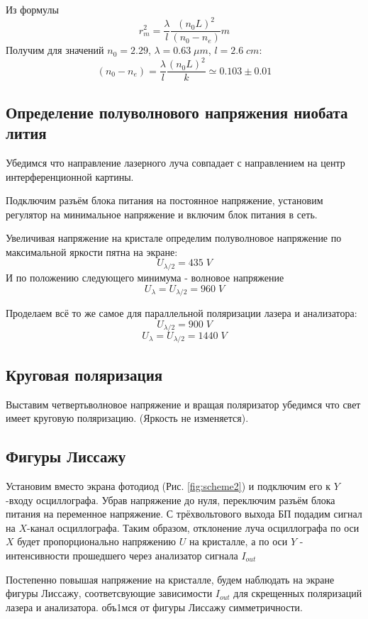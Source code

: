 \documentclass{article}
\begin{document}
Из формулы
\[ r_m^2 = \frac{\lambda}{l}\frac{(n_0L)^2}{(n_0-n_e)}m\]
Получим для значений \(n_0 = 2.29\), \(\lambda = 0.63\;\mu m\), \(l = 2.6\;cm\):
\begin{equation}
  (n_0 - n_e) = \frac{\lambda}{l}\frac{(n_0L)^2}{k} \simeq 0.103 \pm 0.01
\end{equation}

\subsection{Определение полуволнового напряжения ниобата лития} \label{sec:U}
Убедимся что направление лазерного луча совпадает с направлением на центр интерференционной картины.

Подключим разъём блока питания на постоянное напряжение, установим регулятор на минимальное
напряжение и включим блок питания в сеть.

Увеличивая напряжение на кристале определим полуволновое напряжение по максимальной яркости пятна на
экране:
\begin{equation} \label{eq:U0.5}
  U_{\lambda/2} = 435\;V
\end{equation}
И по положению следующего минимума - волновое напряжение
\[ U_{\lambda} = U_{\lambda/2} = 960\; V\]

Проделаем всё то же самое для параллельной поляризации лазера и анализатора:
\[ U_{\lambda/2} = 900\;V\]
\[ U_{\lambda} = U_{\lambda/2} = 1440\;V\]

\subsection{Круговая поляризация}
Выставим четвертьволновое напряжение и вращая поляризатор убедимся что свет имеет круговую поляризацию.
(Яркость не изменяется).

\subsection{Фигуры Лиссажу} \label{sec:Liss}
Установим вместо экрана фотодиод (Рис. \ref{fig:scheme2}) и подключим его к \(Y\)-входу осциллографа.
Убрав напряжение до нуля, переключим разъём блока питания на переменное напряжение. С трёхвольтового
выхода БП подадим сигнал на  \(X\)-канал осциллографа. Таким образом, отклонение луча осциллографа по
оси \(X\) будет пропорционально напряжению \(U\) на кристалле, а по оси \(Y\) - интенсивности прошедшего
через анализатор сигнала \(I_{out}\)

Постепенно повышая напряжение на кристалле, будем наблюдать на экране фигуры Лиссажу, соответсвующие
зависимости \(I_{out}\) для скрещенных поляризаций лазера и анализатора. объ1мся от фигуры Лиссажу
симметричности.
\end{document}

